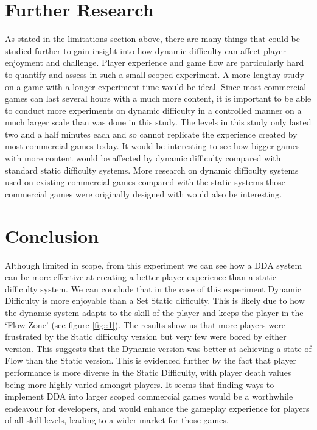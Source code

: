 \documentclass[journal]{IEEEtran}
\begin{document}
\section{Further Research}
As stated in the limitations section above, there are many things that could be studied further to gain insight into how dynamic difficulty can affect player enjoyment and challenge. Player experience and game flow are particularly hard to quantify and assess in such a small scoped experiment. A more lengthy study on a game with a longer experiment time would be ideal. Since most commercial games can last several hours with a much more content, it is important to be able to conduct more experiments on dynamic difficulty in a controlled manner on a much larger scale than was done in this study. The levels in this study only lasted two and a half minutes each and so cannot replicate the experience created by most commercial games today. It would be interesting to see how bigger games with more content would be affected by dynamic difficulty compared with standard static difficulty systems. More research on dynamic difficulty systems used on existing commercial games compared with the static systems those commercial games were originally designed with would also be interesting.

\section{Conclusion}
Although limited in scope, from this experiment we can see how a DDA system can be more effective at creating a better player experience than a static difficulty system.  We can conclude that in the case of this experiment Dynamic Difficulty is more enjoyable than a Set Static difficulty. This is likely due to how the dynamic system adapts to the skill of the player and keeps the player in the `Flow Zone' (see figure \ref{fig::1}). The results show us that more players were frustrated by the Static difficulty version but very few were bored by either version. This suggests that the Dynamic version was better at achieving a state of Flow than the Static version. This is evidenced further by the fact that player performance is more diverse in the Static Difficulty, with player death values being more highly varied amongst players. It seems that finding ways to implement DDA into larger scoped commercial games would be a worthwhile endeavour for developers, and would enhance the gameplay experience for players of all skill levels, leading to a wider market for those games.
\end{document}

